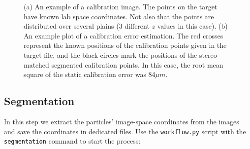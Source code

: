 \documentclass[10pt,a4paper]{article}
\begin{document}
\begin{figure}
	\centering
	\hfill
	\caption{(a) An example of a calibration image. The points on the target have known lab space coordinates. Not also that the points are distributed over several plains (3 different $z$ values in this case). (b) An example plot of a calibration error estimation. The red crosses represent the known positions of the calibration points given in the target file, and the black circles mark the positions of the stereo-matched segmented calibration points. In this case, the root mean square of the static calibration error was 84$\mu m$.}
\end{figure}





\subsection{Segmentation}\label{sec:workflow_segment}


In this step we extract the particles' image-space coordinates from the images and save the coordinates in dedicated files. Use the \texttt{workflow.py} script with the \texttt{segmentation} command to start the process:
\end{document}
